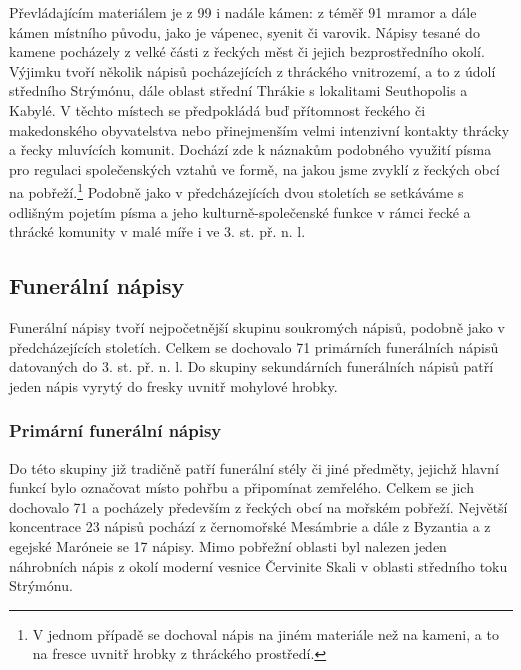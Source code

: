 Převládajícím materiálem je z 99  i nadále kámen: z téměř 91  mramor a dále kámen místního původu, jako je vápenec, syenit či varovik. Nápisy tesané do kamene pocházely z velké části z řeckých měst či jejich bezprostředního okolí. Výjimku tvoří několik nápisů pocházejících z thráckého vnitrozemí, a to z údolí středního Strýmónu, dále oblast střední Thrákie s lokalitami Seuthopolis a Kabylé. V těchto místech se předpokládá buď přítomnost řeckého či makedonského obyvatelstva nebo přinejmenším velmi intenzivní kontakty thrácky a řecky mluvících komunit. Dochází zde k náznakům podobného využití písma pro regulaci společenských vztahů ve formě, na jakou jsme zvyklí z řeckých obcí na pobřeží.\footnote{V jednom případě se dochoval nápis na jiném materiále než na kameni, a to na fresce uvnitř hrobky z thráckého prostředí.} Podobně jako v předcházejících dvou stoletích se setkáváme s odlišným pojetím písma a jeho kulturně-společenské funkce v rámci řecké a thrácké komunity v malé míře i ve 3. st. př. n. l.

\subsection[funerální-nápisy-5]{Funerální nápisy}

Funerální nápisy tvoří nejpočetnější skupinu soukromých nápisů, podobně jako v předcházejících stoletích. Celkem se dochovalo 71 primárních funerálních nápisů datovaných do 3. st. př. n. l. Do skupiny sekundárních funerálních nápisů patří jeden nápis vyrytý do fresky uvnitř mohylové hrobky.

\subsubsection[primární-funerální-nápisy-2]{Primární funerální nápisy}

Do této skupiny již tradičně patří funerální stély či jiné předměty, jejichž hlavní funkcí bylo označovat místo pohřbu a připomínat zemřelého. Celkem se jich dochovalo 71 a pocházely především z řeckých obcí na mořském pobřeží. Největší koncentrace 23 nápisů pochází z černomořské Mesámbrie a dále z Byzantia a z egejské Maróneie se 17 nápisy. Mimo pobřežní oblasti byl nalezen jeden náhrobních nápis z okolí moderní vesnice Červinite Skali v oblasti středního toku Strýmónu.

